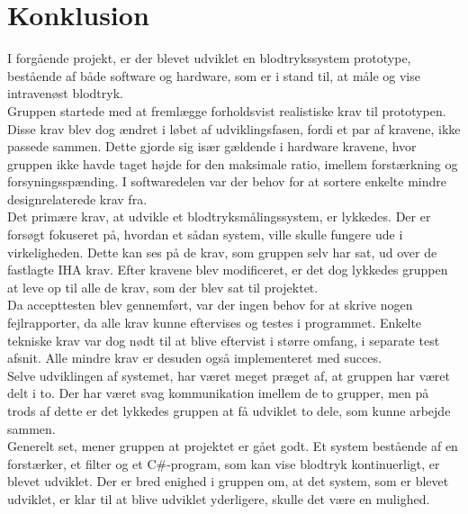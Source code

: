 \chapter{Konklusion}
I forgående projekt, er der blevet udviklet en blodtrykssystem prototype, bestående af både software og hardware, som er i stand til, at måle og vise intravenøst blodtryk. \\[1ex]
Gruppen startede med at fremlægge forholdsvist realistiske krav til prototypen. Disse krav blev dog ændret i løbet af udviklingsfasen, fordi et par af kravene, ikke passede sammen. Dette gjorde sig især gældende i hardware kravene, hvor gruppen ikke havde taget højde for den maksimale ratio, imellem forstærkning og forsyningsspænding. I softwaredelen var der behov for at sortere enkelte mindre designrelaterede krav fra.\\[1ex]
Det primære krav, at udvikle et blodtryksmålingssystem, er lykkedes. Der er forsøgt fokuseret på, hvordan et sådan system, ville skulle fungere ude i virkeligheden. Dette kan ses på de krav, som gruppen selv har sat, ud over de fastlagte IHA krav. Efter kravene blev modificeret, er det dog lykkedes gruppen at leve op til alle de krav, som der blev sat til projektet. \\[1ex]
Da accepttesten blev gennemført, var der ingen behov for at skrive nogen fejlrapporter, da alle krav kunne eftervises og testes i programmet. Enkelte tekniske krav var dog nødt til at blive eftervist i større omfang, i separate test afsnit. Alle mindre krav er desuden også implementeret med succes.\\[1ex]
Selve udviklingen af systemet, har været meget præget af, at gruppen har været delt i to. Der har været svag kommunikation imellem de to grupper, men på trods af dette er det lykkedes gruppen at få udviklet to dele, som kunne arbejde sammen. \\[1ex]
Generelt set, mener gruppen at projektet er gået godt. Et system bestående af en forstærker, et filter og et C\#-program, som kan vise blodtryk kontinuerligt, er blevet udviklet. Der er bred enighed i gruppen om, at det system, som er blevet udviklet, er klar til at blive udviklet yderligere, skulle det være en mulighed. \\[1ex]


